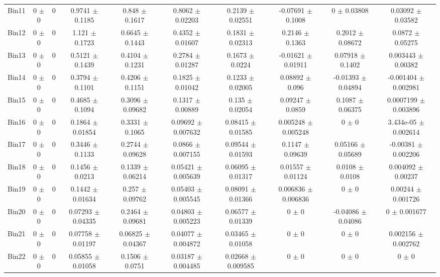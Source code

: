 \begin{tabular}{@{\extracolsep{4pt}}lccccccccc@{}}
     Bin11 & 0 $\pm$ 0 & 0 & 0.9741 $\pm$ 0.1185 & 0.848 $\pm$ 0.1617 & 0.8062 $\pm$ 0.02203 & 0.2139 $\pm$ 0.02551 & -0.07691 $\pm$ 0.1008 & 0 $\pm$ 0.03808 & 0.03092 $\pm$ 0.03582 \\ 
     Bin12 & 0 $\pm$ 0 & 0 & 1.121 $\pm$ 0.1723 & 0.6645 $\pm$ 0.1443 & 0.4352 $\pm$ 0.01607 & 0.1831 $\pm$ 0.02313 & 0.2146 $\pm$ 0.1363 & 0.2012 $\pm$ 0.08672 & 0.0872 $\pm$ 0.05275 \\ 
     Bin13 & 0 $\pm$ 0 & 0 & 0.5121 $\pm$ 0.1439 & 0.4104 $\pm$ 0.1231 & 0.2784 $\pm$ 0.01287 & 0.1673 $\pm$ 0.0224 & -0.01621 $\pm$ 0.01911 & 0.07918 $\pm$ 0.1402 & 0.003443 $\pm$ 0.00382 \\ 
     Bin14 & 0 $\pm$ 0 & 0 & 0.3794 $\pm$ 0.1101 & 0.4206 $\pm$ 0.1151 & 0.1825 $\pm$ 0.01042 & 0.1233 $\pm$ 0.02005 & 0.08892 $\pm$ 0.096 & -0.01393 $\pm$ 0.04894 & -0.001404 $\pm$ 0.002981 \\ 
     Bin15 & 0 $\pm$ 0 & 0 & 0.4685 $\pm$ 0.1094 & 0.3096 $\pm$ 0.09682 & 0.1317 $\pm$ 0.00889 & 0.135 $\pm$ 0.02054 & 0.09247 $\pm$ 0.0859 & 0.1087 $\pm$ 0.06375 & 0.0007199 $\pm$ 0.003896 \\ 
     Bin16 & 0 $\pm$ 0 & 0 & 0.1864 $\pm$ 0.01854 & 0.3331 $\pm$ 0.1065 & 0.09692 $\pm$ 0.007632 & 0.08415 $\pm$ 0.01585 & 0.005248 $\pm$ 0.005248 & 0 $\pm$ 0 & 3.434e-05 $\pm$ 0.002614 \\ 
     Bin17 & 0 $\pm$ 0 & 0 & 0.3446 $\pm$ 0.1133 & 0.2744 $\pm$ 0.09628 & 0.0866 $\pm$ 0.007155 & 0.09544 $\pm$ 0.01593 & 0.1147 $\pm$ 0.09639 & 0.05166 $\pm$ 0.05689 & -0.00381 $\pm$ 0.002206 \\ 
     Bin18 & 0 $\pm$ 0 & 0 & 0.1456 $\pm$ 0.0213 & 0.1339 $\pm$ 0.06214 & 0.05421 $\pm$ 0.005639 & 0.06095 $\pm$ 0.01317 & 0.01557 $\pm$ 0.01124 & 0.0108 $\pm$ 0.0108 & 0.004092 $\pm$ 0.00237 \\ 
     Bin19 & 0 $\pm$ 0 & 0 & 0.1442 $\pm$ 0.01634 & 0.257 $\pm$ 0.09762 & 0.05403 $\pm$ 0.005545 & 0.08091 $\pm$ 0.01366 & 0.006836 $\pm$ 0.006836 & 0 $\pm$ 0 & 0.00244 $\pm$ 0.001726 \\ 
     Bin20 & 0 $\pm$ 0 & 0 & 0.07293 $\pm$ 0.04335 & 0.2464 $\pm$ 0.09681 & 0.04803 $\pm$ 0.005223 & 0.06577 $\pm$ 0.01339 & 0 $\pm$ 0 & -0.04086 $\pm$ 0.04086 & 0 $\pm$ 0.001677 \\ 
     Bin21 & 0 $\pm$ 0 & 0 & 0.07758 $\pm$ 0.01197 & 0.06825 $\pm$ 0.04367 & 0.04077 $\pm$ 0.004872 & 0.03465 $\pm$ 0.01058 & 0 $\pm$ 0 & 0 $\pm$ 0 & 0.002156 $\pm$ 0.002762 \\ 
     Bin22 & 0 $\pm$ 0 & 0 & 0.05855 $\pm$ 0.01058 & 0.1506 $\pm$ 0.0751 & 0.03187 $\pm$ 0.004485 & 0.02668 $\pm$ 0.009585 & 0 $\pm$ 0 & 0 $\pm$ 0 & 0 $\pm$ 0 \\ 

\end{tabular}
